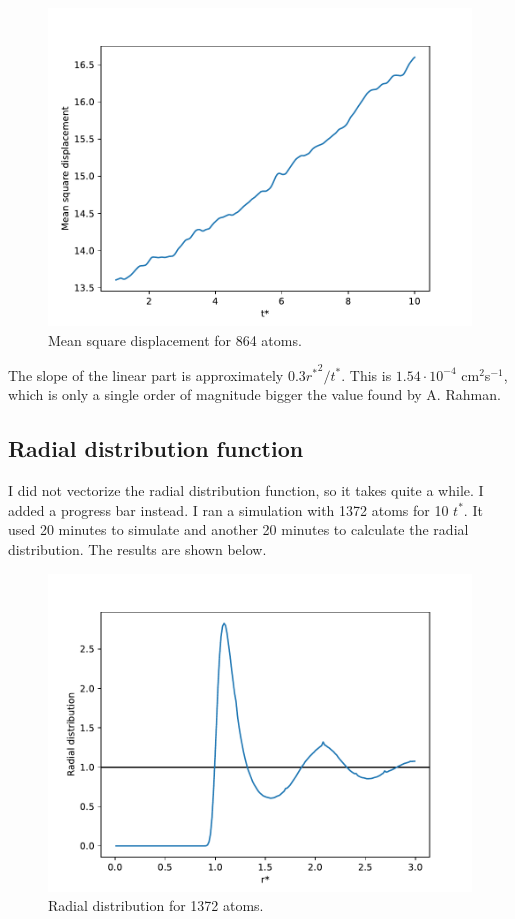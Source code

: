 \documentclass[a4paper,10pt,english]{article}
\begin{document}
\begin{figure}[h!]
    \centering
    \includegraphics[scale=0.65]{../figures/4_c_ii.pdf}
    \caption{Mean square displacement for 864 atoms.}
    \label{msd}
\end{figure}

The slope of the linear part is approximately $0.3{r^*}^2/t^*$. This is $1.54 \cdot 10^{-4}$ cm$^2$s$^{-1}$, which is only a single order of magnitude bigger the value found by A. Rahman. 

\newpage

\subsection{Radial distribution function} \label{4d}

I did not vectorize the radial distribution function, so it takes quite a while. I added a progress bar instead. I ran a simulation with 1372 atoms for 10 $t^*$. It used 20 minutes to simulate and another 20 minutes to calculate the radial distribution. The results are shown below.

\begin{figure}[h!]
    \centering
    \includegraphics[scale=0.65]{../figures/4_d_i.pdf}
    \caption{Radial distribution for 1372 atoms.}
    \label{fig:rdf}
\end{figure}
\end{document}
